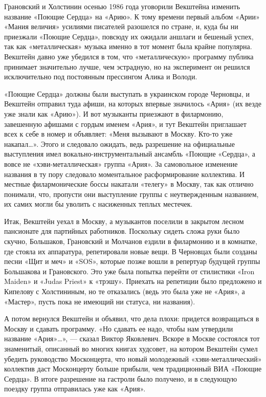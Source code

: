 \documentclass[16pt,a5paper]{book}
\begin{document}
 Грановский и Холстинин осенью 1986 года уговорили Векштейна изменить название «Поющие Сердца» на «Арию». К
тому времени первый альбом «Арии» «Мания величия» усилиями писателей разошелся по стране, и, куда бы ни приезжали
«Поющие Сердца», повсюду их ожидали аншлаги и бешеный успех, так как «металлическая» музыка именно в тот момент была
крайне популярна. Векштейн давно уже убедился в том, что «металлическую» программу публика принимает значительно лучше,
чем эстрадную, но на эксперимент он решился исключительно под постоянным прессингом Алика и Володи.

«Поющие Сердца» должны были выступать в украинском городе Черновцы, и Векштейн отправил туда афиши, на которых впервые
значилось «Ария» (их везде уже знали как «Арию»). И вот музыканты приезжают в филармонию, завешенную афишами с гордым
именем «Ария», и тут Векштейн приглашает всех к себе в номер и объявляет: «Меня вызывают в Москву. Кто-то уже
накапал\ldots». Этого и следовало ожидать, ведь разрешение на официальные выступления имел вокально-инструментальный
ансамбль «Поющие «Сердца», а вовсе не «хэви-металлическая» группа «Ария». За самовольное изменение названия в ту пору
следовало моментальное расформирование коллектива. И местные филармонические боссы накатали «телегу» в Москву, так как
отлично понимали, что, пропусти они выступление группы с неутвержденным названием, их самих могли бы уволить с
насиженных теплых местечек.

Итак, Векштейн уехал в Москву, а музыкантов поселили в закрытом лесном пансионате для партийных работников. Поскольку
сидеть сложа руки было скучно, Большаков, Грановский и Молчанов ездили в филармонию и в комнатке, где стояла их
аппаратура, репетировали новые вещи. В Черновцах были созданы песни «Щит и меч» и «SOS», которые позже вошли в репертуар
будущей группы Большакова и Грановского. Это уже была попытка перейти от стилистики «Iron Maiden» и «Judas Priest» к
«трэшу». Приехать на репетиции было предложено и Кипелову с Холстининым, но те отказались (ведь это была уже не «Ария»,
а «Мастер», пусть пока не имеющий ни статуса, ни названия).

А потом вернулся Векштейн и объявил, что дела плохи: придется возвращаться в Москву и сдавать программу. «Но сдавать ее
надо, чтобы нам утвердили название «Ария»\ldots», — сказал Виктор Яковлевич. Вскоре в Москве состоялся тот знаменитый,
описанный во многих книгах худсовет, на котором Векштейн сумел убедить руководство Москонцерта, что новый молодежный
«хэви-металлический» коллектив даст Москонцерту больше прибыли, чем традиционный ВИА «Поющие Сердца». В итоге разрешение
на гастроли было получено, и в следующую поездку группа отправилась уже как «Ария».
\end{document}

